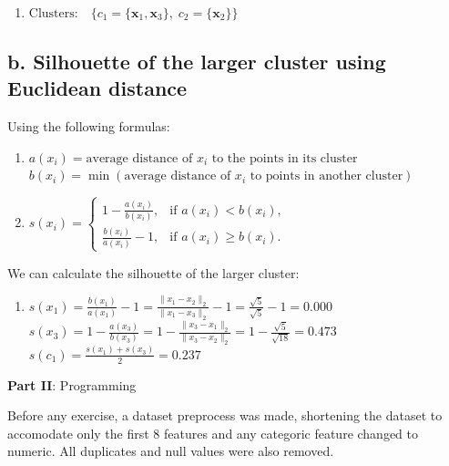 \documentclass[12pt]{article}
\begin{document}
\begin{enumerate}[leftmargin=0pt, label=\textbf{\arabic*.)}]
\begin{enumerate}
              \item[]
                    $\text{Clusters:} \quad \{ c_1 = \{ \mathbf{x}_1, \mathbf{x}_3 \}, \; c_2 = \{ \mathbf{x}_2 \} \}$
          \end{enumerate}

          \subsection*{b. Silhouette of the larger cluster using Euclidean distance}
          Using the following formulas:
          \begin{enumerate}
              \item[]
                    $a(x_i) = \text{average distance of } x_i \text{ to the points in its cluster}$ \\
                    $b(x_i) = \min(\text{average distance of } x_i \text{ to points in another cluster})$ \\

              \item[]
                    $s(x_i) =
                        \begin{cases}
                            1 - \frac{a(x_i)}{b(x_i)}, & \text{if } a(x_i) < b(x_i),    \\[6pt]
                            \frac{b(x_i)}{a(x_i)} - 1, & \text{if } a(x_i) \geq b(x_i).
                        \end{cases}$
          \end{enumerate}

          We can calculate the silhouette of the larger cluster:
          \begin{enumerate}
              \item[]
                    $s(x_1) = \frac{b(x_1)}{a(x_1)} - 1 = \frac{\|x_1 - x_2\|_2}{\|x_1 - x_3\|_2} - 1 = \frac{\sqrt{5}}{\sqrt{5}} - 1 = 0.000$ \\
                    $s(x_3) = 1 - \frac{a(x_3)}{b(x_3)} = 1 - \frac{\|x_3 - x_1\|_2}{\|x_3 - x_2\|_2} = 1 - \frac{\sqrt{5}}{\sqrt{18}} = 0.473$ \\
                    $s(c_1) = \frac{s(x_1) + s(x_3)}{2} = 0.237$
          \end{enumerate}
\end{enumerate}

\large{\textbf{Part II}: Programming}\normalsize
\vspace{1em}

Before any exercise, a dataset preprocess was made, shortening the dataset to accomodate only the first 8 features and any categoric feature changed to numeric.
All duplicates and null values were also removed.
\end{document}
